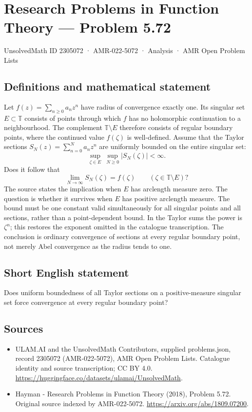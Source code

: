 \documentclass[11pt,a4paper]{article}
\begin{document}
\section*{Research Problems in Function Theory — Problem 5.72}\label{2305072}
{\small UnsolvedMath ID 2305072 · AMR-022-5072 · Analysis · AMR Open Problem Lists}
\subsection{Definitions and mathematical statement}
Let $f(z)=\sum_{n\ge0}a_nz^n$ have radius of convergence exactly one. Its singular set $E\subset\mathbb T$ consists of points through which $f$ has no holomorphic continuation to a neighbourhood. The complement $\mathbb T\setminus E$ therefore consists of regular boundary points, where the continued value $f(\zeta)$ is well-defined.
Assume that the Taylor sections $S_N(z)=\sum_{n=0}^Na_nz^n$ are uniformly bounded on the entire singular set:
\[
\sup_{\zeta\in E}\ \sup_{N\ge0}|S_N(\zeta)|<\infty.
\]
Does it follow that
\[
\lim_{N\to\infty}S_N(\zeta)=f(\zeta)
\qquad(\zeta\in\mathbb T\setminus E)?
\]
The source states the implication when $E$ has arclength measure zero. The question is whether it survives when $E$ has positive arclength measure. The bound must be one constant valid simultaneously for all singular points and all sections, rather than a point-dependent bound.
In the Taylor sums the power is $\zeta^n$; this restores the exponent omitted in the catalogue transcription. The conclusion is ordinary convergence of sections at every regular boundary point, not merely Abel convergence as the radius tends to one.
\subsection{Short English statement}
Does uniform boundedness of all Taylor sections on a positive-measure singular set force convergence at every regular boundary point?
\subsection{Sources}
\begin{itemize}
\item[S1] ULAM.AI and the UnsolvedMath Contributors, supplied problems.json, record 2305072 (AMR-022-5072), AMR Open Problem Lists. Catalogue identity and source transcription; CC BY 4.0.
\url{https://huggingface.co/datasets/ulamai/UnsolvedMath}.
\item[S2] Hayman - Research Problems in Function Theory (2018), Problem 5.72. Original source indexed by AMR-022-5072.
\url{https://arxiv.org/abs/1809.07200}.
\end{itemize}
\end{document}
